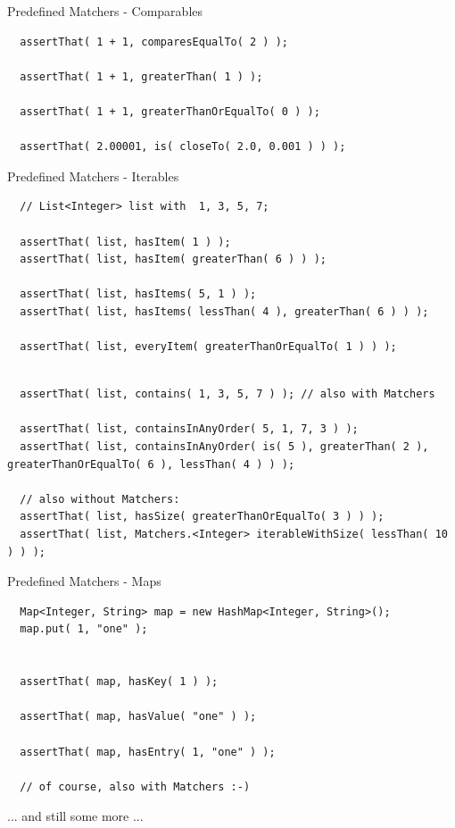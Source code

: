 \begin{frame}[fragile]{Predefined Matchers - Comparables}
\begin{lstlisting}
  assertThat( 1 + 1, comparesEqualTo( 2 ) );

  assertThat( 1 + 1, greaterThan( 1 ) );

  assertThat( 1 + 1, greaterThanOrEqualTo( 0 ) );
  
  assertThat( 2.00001, is( closeTo( 2.0, 0.001 ) ) );
\end{lstlisting}
\end{frame}


\begin{frame}[fragile]{Predefined Matchers - Iterables}
\begin{lstlisting}
  // List<Integer> list with  1, 3, 5, 7;
  
  assertThat( list, hasItem( 1 ) );
  assertThat( list, hasItem( greaterThan( 6 ) ) );
  
  assertThat( list, hasItems( 5, 1 ) );
  assertThat( list, hasItems( lessThan( 4 ), greaterThan( 6 ) ) );

  assertThat( list, everyItem( greaterThanOrEqualTo( 1 ) ) );
  
\end{lstlisting}


\begin{lstlisting}
  assertThat( list, contains( 1, 3, 5, 7 ) ); // also with Matchers
  
  assertThat( list, containsInAnyOrder( 5, 1, 7, 3 ) );
  assertThat( list, containsInAnyOrder( is( 5 ), greaterThan( 2 ), greaterThanOrEqualTo( 6 ), lessThan( 4 ) ) );

  // also without Matchers:
  assertThat( list, hasSize( greaterThanOrEqualTo( 3 ) ) );           
  assertThat( list, Matchers.<Integer> iterableWithSize( lessThan( 10 ) ) );
\end{lstlisting}

\end{frame}


\begin{frame}[fragile]{Predefined Matchers - Maps}
\begin{lstlisting}
  Map<Integer, String> map = new HashMap<Integer, String>();
  map.put( 1, "one" );


  assertThat( map, hasKey( 1 ) );
  
  assertThat( map, hasValue( "one" ) );
  
  assertThat( map, hasEntry( 1, "one" ) );

  // of course, also with Matchers :-)
\end{lstlisting}

  \vspace{1cm}
  ... and still some more ...

\end{frame}


